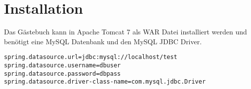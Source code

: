 \section{Installation}

Das Gästebuch kann in Apache Tomcat 7 als WAR Datei installiert werden
und benötigt eine MySQL Datenbank und den MySQL JDBC Driver.

\begin{lstlisting}[style=numbers,title=application.properties]
spring.datasource.url=jdbc:mysql://localhost/test
spring.datasource.username=dbuser
spring.datasource.password=dbpass
spring.datasource.driver-class-name=com.mysql.jdbc.Driver
\end{lstlisting}

